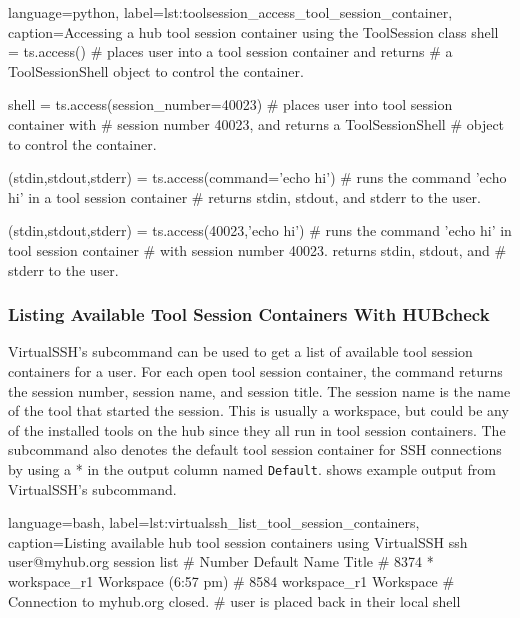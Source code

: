 \begin{xcode}{%
  language=python,%
  label=lst:toolsession_access_tool_session_container,%
  caption={Accessing a hub tool session container using the ToolSession class}%
}
shell = ts.access()
# places user into a tool session container and returns
# a ToolSessionShell object to control the container.

shell = ts.access(session_number=40023)
# places user into tool session container with
# session number 40023, and returns a ToolSessionShell
# object to control the container.

(stdin,stdout,stderr) = ts.access(command='echo hi')
# runs the command 'echo hi' in a tool session container
# returns stdin, stdout, and stderr to the user.

(stdin,stdout,stderr) = ts.access(40023,'echo hi')
# runs the command 'echo hi' in  tool session container
# with session number 40023. returns stdin, stdout, and
# stderr to the user.
\end{xcode}


\subsubsection{Listing Available Tool Session Containers With HUBcheck}
\label{ssec:hubcheck_shell_modules_listing_containers}

VirtualSSH's  subcommand can be used to get a list of
available tool session containers for a user. For each open tool session
container, the command returns the session number, session name, and session
title. The session name is the name of the tool that started the session. This
is usually a workspace, but could be any of the installed tools on the hub
since they all run in tool session containers. The 
subcommand also denotes the default tool session container for SSH connections by
using a * in the output column named \texttt{Default}.
 shows example output from
VirtualSSH's  subcommand.

\begin{xcode}{%
  language=bash,%
  label=lst:virtualssh_list_tool_session_containers,%
  caption={Listing available hub tool session containers using VirtualSSH}%
}
ssh user@myhub.org session list
#   Number  Default Name                 Title
#     8374     *    workspace_r1         Workspace (6:57 pm)
#     8584          workspace_r1         Workspace
# Connection to myhub.org closed.
# user is placed back in their local shell
\end{xcode}

